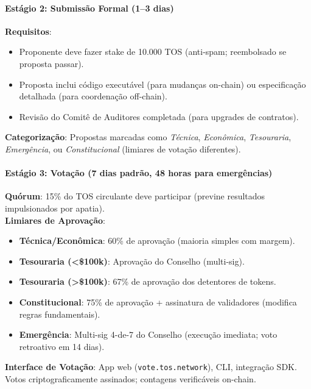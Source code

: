 \documentclass[11pt]{article}
\begin{document}
\begin{itemize}[noitemsep]
\begin{itemize}[noitemsep]
\begin{itemize}[noitemsep]
\paragraph{Estágio 2: Submissão Formal (1--3 dias)}
\textbf{Requisitos}:
\begin{itemize}[noitemsep]
  \item Proponente deve fazer stake de 10.000 TOS (anti-spam; reembolsado se proposta passar).
  \item Proposta inclui código executável (para mudanças on-chain) ou especificação detalhada (para coordenação off-chain).
  \item Revisão do Comitê de Auditores completada (para upgrades de contratos).
\end{itemize}
\textbf{Categorização}: Propostas marcadas como \emph{Técnica}, \emph{Econômica}, \emph{Tesouraria}, \emph{Emergência}, ou \emph{Constitucional} (limiares de votação diferentes).

\paragraph{Estágio 3: Votação (7 dias padrão, 48 horas para emergências)}
\textbf{Quórum}: 15\% do TOS circulante deve participar (previne resultados impulsionados por apatia).\\
\textbf{Limiares de Aprovação}:
\begin{itemize}[noitemsep]
  \item \textbf{Técnica/Econômica}: 60\% de aprovação (maioria simples com margem).
  \item \textbf{Tesouraria (<\$100k)}: Aprovação do Conselho (multi-sig).
  \item \textbf{Tesouraria (>\$100k)}: 67\% de aprovação dos detentores de tokens.
  \item \textbf{Constitucional}: 75\% de aprovação + assinatura de validadores (modifica regras fundamentais).
  \item \textbf{Emergência}: Multi-sig 4-de-7 do Conselho (execução imediata; voto retroativo em 14 dias).
\end{itemize}
\textbf{Interface de Votação}: App web (\texttt{vote.tos.network}), CLI, integração SDK. Votos criptograficamente assinados; contagens verificáveis on-chain.


\end{itemize}
\end{itemize}
\end{itemize}
\end{document}
